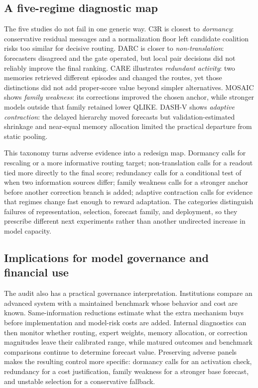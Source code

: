 \documentclass{crebss}
\begin{document}
\subsection{A five-regime diagnostic map}

The five studies do not fail in one generic way. C3R is closest to \emph{dormancy}: conservative residual messages and a normalization floor left candidate coalition risks too similar for decisive routing. DARC is closer to \emph{non-translation}: forecasters disagreed and the gate operated, but local pair decisions did not reliably improve the final ranking. CARE illustrates \emph{redundant activity}: two memories retrieved different episodes and changed the routes, yet those distinctions did not add proper-score value beyond simpler alternatives. MOSAIC shows \emph{family weakness}: its corrections improved the chosen anchor, while stronger models outside that family retained lower QLIKE. DASH-V shows \emph{adaptive contraction}: the delayed hierarchy moved forecasts but validation-estimated shrinkage and near-equal memory allocation limited the practical departure from static pooling.

This taxonomy turns adverse evidence into a redesign map. Dormancy calls for rescaling or a more informative routing target; non-translation calls for a readout tied more directly to the final score; redundancy calls for a conditional test of when two information sources differ; family weakness calls for a stronger anchor before another correction branch is added; adaptive contraction calls for evidence that regimes change fast enough to reward adaptation. The categories distinguish failures of representation, selection, forecast family, and deployment, so they prescribe different next experiments rather than another undirected increase in model capacity.

\subsection{Implications for model governance and financial use}

The audit also has a practical governance interpretation. Institutions compare an advanced system with a maintained benchmark whose behavior and cost are known. Same-information reductions estimate what the extra mechanism buys before implementation and model-risk costs are added. Internal diagnostics can then monitor whether routing, expert weights, memory allocation, or correction magnitudes leave their calibrated range, while matured outcomes and benchmark comparisons continue to determine forecast value. Preserving adverse panels makes the resulting control more specific: dormancy calls for an activation check, redundancy for a cost justification, family weakness for a stronger base forecast, and unstable selection for a conservative fallback.
\end{document}
